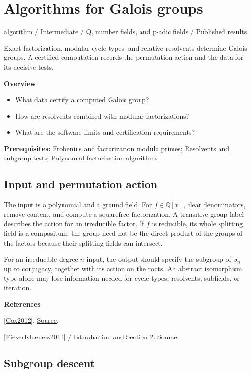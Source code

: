 \documentclass[11pt,a4paper,oneside,openany]{book}
\newenvironment{sources}{\par\smallskip\begingroup\footnotesize\color{atlasgray}\leftskip=10pt\setlength{\parskip}{2pt}}{\par\endgroup\smallskip}
\begin{document}
\chapter{Algorithms for Galois groups}\label{article:galois-computation}\hypertarget{article:galois-computation}{}\color{black}
{\sffamily\small\color{atlasgold}algorithm / Intermediate / Q, number fields, and p-adic fields / Published results}\par\medskip
Exact factorization, modular cycle types, and relative resolvents determine Galois groups. A certified computation records the permutation action and the data for its decisive tests.\par\medskip
\textbf{Overview}\begin{itemize}
\item What data certify a computed Galois group?
\item How are resolvents combined with modular factorizations?
\item What are the software limits and certification requirements?
\end{itemize}
{\small\textbf{Prerequisites:} \hyperlink{article:frobenius}{Frobenius and factorization modulo primes}; \hyperlink{article:resolvents}{Resolvents and subgroup tests}; \hyperlink{article:factorization-algorithms}{Polynomial factorization algorithms}}\par
{}\section{Input and permutation action}
\color{black} The input is a polynomial and a ground field. For \(f\in\mathbb Q[x]\), clear denominators, remove content, and compute a squarefree factorization. A transitive-group label describes the action for an irreducible factor. If \(f\) is reducible, its whole splitting field is a compositum; the group need not be the direct product of the groups of the factors because their splitting fields can intersect.\par
\color{black} For an irreducible degree-\(n\) input, the output should specify the subgroup of \(S_n\) up to conjugacy, together with its action on the roots. An abstract isomorphism type alone may lose information needed for cycle types, resolvents, subfields, or iteration.\par
\begin{sources}
\textbf{References}\par\smallskip
\noindent\hyperlink{ref:Cox2012}{[Cox2012]}.  \href{https://onlinelibrary.wiley.com/doi/book/10.1002/9781118218457}{Source}.\par
\noindent\hyperlink{ref:FiekerKlueners2014}{[FiekerKlueners2014]} / Introduction and Section 2.  \href{https://doi.org/10.1112/S1461157013000302}{Source}.\par
\end{sources}\color{black}
\section{Subgroup descent}
\end{document}
